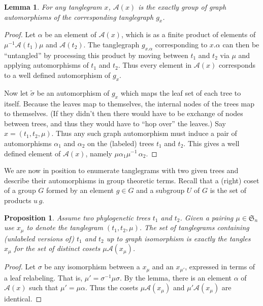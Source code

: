 \documentclass{amsart}
\newtheorem{lemma}{Lemma}
\newtheorem{proposition}{Proposition}
\newcommand{\fS}{\mathfrak S}
\newcommand{\aut}{\mathcal A}
\newcommand{\pairing}{\mu}
\begin{document}
\begin{lemma}
For any tanglegram $x$, $\aut(x)$ is the exactly group of graph automorphisms of the corresponding tanglegraph $g_x$.
\end{lemma}
\begin{proof}
Let $\alpha$ be an element of $\aut(x)$, which is as a finite product of elements of $\pairing^{-1} \aut(t_1) \pairing$ and $\aut(t_2)$.
The tanglegraph $g_{x . \alpha}$ corresponding to $x . \alpha$ can then be ``untangled'' by processing this product by moving between $t_1$ and $t_2$ via $\pairing$ and applying automorphisms of $t_1$ and $t_2$.
Thus every element in $\aut(x)$ corresponds to a well defined automorphism of $g_x$.

Now let $\tilde \sigma$ be an automorphism of $g_x$ which maps the leaf set of each tree to itself.
Because the leaves map to themselves, the internal nodes of the trees map to themselves.
(If they didn't then there would have to be exchange of nodes between trees, and thus they would have to ``hop over'' the leaves.)
Say $x = (t_1, t_2, \pairing)$.
Thus any such graph automorphism must induce a pair of automorphisms $\alpha_1$ and $\alpha_2$ on the (labeled) trees $t_1$ and $t_2$.
This gives a well defined element of $\aut(x)$, namely $\pairing \alpha_1 \pairing^{-1} \, \alpha_2$.
\end{proof}

We are now in position to enumerate tanglegrams with two given trees and describe their automorphisms in group theoretic terms.
Recall that a (right) coset of a group $G$ formed by an element $g \in G$ and a subgroup $U$ of $G$ is the set of products $u\, g$.
\begin{proposition}
\label{prop:cosets}
Assume two phylogenetic trees $t_1$ and $t_2$.
Given a pairing $\pairing \in \fS_n$ use $x_\pairing$ to denote the tanglegram $(t_1, t_2, \pairing)$.
The set of tanglegrams containing (unlabeled versions of) $t_1$ and $t_2$ up to graph isomorphism is exactly the tangles $x_\pairing$ for the set of distinct cosets $\pairing \aut(x_\pairing)$.
\end{proposition}
\begin{proof}
Let $\sigma$ be any isomorphism between a $x_\pairing$ and an $x_{\pairing'}$, expressed in terms of a leaf relabeling.
That is, $\pairing' = \sigma^{-1} \pairing \sigma$.
By the lemma, there is an element $\alpha$ of $\aut(x)$ such that $\pairing' = \pairing \alpha$.
Thus the cosets $\pairing \aut(x_\pairing)$ and $\pairing' \aut(x_\pairing)$ are identical.
\end{proof}
\end{document}
